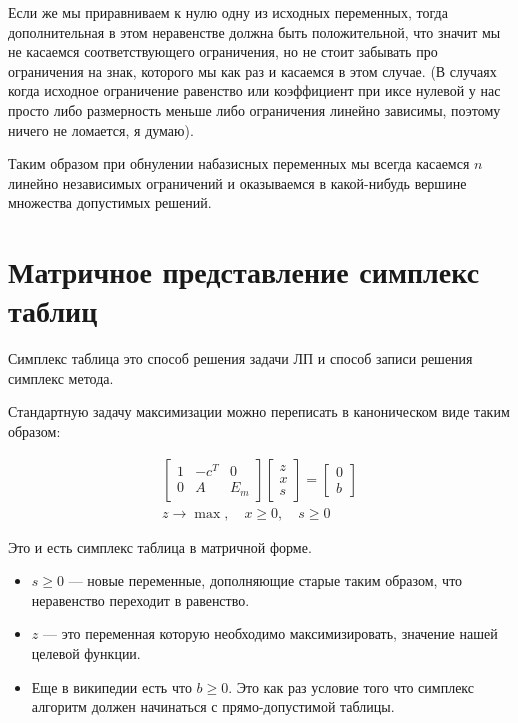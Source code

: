 \documentclass[a4paper,article,14pt]{extarticle}
\begin{document}
Если же мы приравниваем к нулю одну из исходных переменных, тогда дополнительная в этом неравенстве должна быть положительной, что значит мы не касаемся соответствующего ограничения, но не стоит забывать про ограничения на знак, которого мы как раз и касаемся в этом случае. (В случаях когда исходное ограничение равенство или коэффициент при иксе нулевой у нас просто либо размерность меньше либо ограничения линейно зависимы, поэтому ничего не ломается, я думаю).

Таким образом при обнулении набазисных переменных мы всегда касаемся \(n\) линейно независимых ограничений и оказываемся в какой-нибудь вершине множества допустимых решений.

\section{Матричное представление симплекс таблиц}

Симплекс таблица это способ решения задачи ЛП и способ записи решения симплекс метода.

Стандартную задачу максимизации можно переписать в каноническом виде таким образом:

\begin{equation}
    \begin{gathered}
        \begin{bmatrix}
            1 & -c^T & 0 \\
            0 & A & E_m
        \end{bmatrix}
        \begin{bmatrix}
            z \\ x \\ s
        \end{bmatrix}
        =
        \begin{bmatrix}
            0 \\ b
        \end{bmatrix}
        \\
        z \rightarrow \max, \quad x \ge 0, \quad s \ge 0
    \end{gathered}
\end{equation}

Это и есть симплекс таблица в матричной форме.

\begin{itemize}
    \item \(s \ge 0\) --- новые переменные, дополняющие старые таким образом, что неравенство переходит в равенство.
    \item \(z\) --- это переменная которую необходимо максимизировать, значение нашей целевой функции.
    \item
        Еще в википедии есть что \(b \ge 0\).
        Это как раз условие того что симплекс алгоритм должен начинаться с прямо-допустимой таблицы.
\end{itemize}
\end{document}
